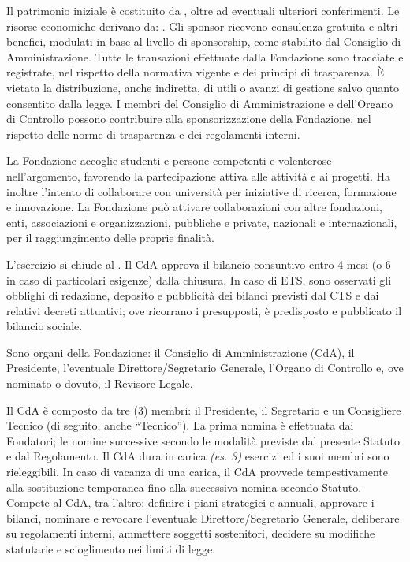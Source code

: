 \documentclass[11pt,a4paper]{article}
\begin{document}
 Il patrimonio iniziale è costituito da , oltre ad eventuali ulteriori conferimenti.
 Le risorse economiche derivano da: \FontiFinanziamento. 
 Gli sponsor ricevono consulenza gratuita e altri benefici, modulati in base al livello di sponsorship, come stabilito dal Consiglio di Amministrazione.
 Tutte le transazioni effettuate dalla Fondazione sono tracciate e registrate, nel rispetto della normativa vigente e dei principi di trasparenza.
È vietata la distribuzione, anche indiretta, di utili o avanzi di gestione salvo quanto consentito dalla legge.
 I membri del Consiglio di Amministrazione e dell'Organo di Controllo possono contribuire alla sponsorizzazione della Fondazione, nel rispetto delle norme di trasparenza e dei regolamenti interni.

 La Fondazione accoglie studenti e persone competenti e volenterose nell’argomento, favorendo la partecipazione attiva alle attività e ai progetti. Ha inoltre l’intento di collaborare con università per iniziative di ricerca, formazione e innovazione.
 La Fondazione può attivare collaborazioni con altre fondazioni, enti, associazioni e organizzazioni, pubbliche e private, nazionali e internazionali, per il raggiungimento delle proprie finalità.

 L'esercizio si chiude al . Il CdA approva il bilancio consuntivo entro 4 mesi (o 6 in caso di particolari esigenze) dalla chiusura.
\ifETS
{} In caso di ETS, sono osservati gli obblighi di redazione, deposito e pubblicità dei bilanci previsti dal CTS e dai relativi decreti attuativi; ove ricorrano i presupposti, è predisposto e pubblicato il bilancio sociale.
\fi

 Sono organi della Fondazione: il Consiglio di Amministrazione (CdA), il Presidente, l'eventuale Direttore/Segretario Generale, l'Organo di Controllo e, ove nominato o dovuto, il Revisore Legale.

 Il CdA è composto da tre (3) membri: il Presidente, il Segretario e un Consigliere Tecnico (di seguito, anche ``Tecnico''). La prima nomina è effettuata dai Fondatori; le nomine successive secondo le modalità previste dal presente Statuto e dal Regolamento.
 Il CdA dura in carica \textit{(es. 3)} esercizi ed i suoi membri sono rieleggibili. In caso di vacanza di una carica, il CdA provvede tempestivamente alla sostituzione temporanea fino alla successiva nomina secondo Statuto.
 Compete al CdA, tra l'altro: definire i piani strategici e annuali, approvare i bilanci, nominare e revocare l'eventuale Direttore/Segretario Generale, deliberare su regolamenti interni, ammettere soggetti sostenitori, decidere su modifiche statutarie e scioglimento nei limiti di legge.
\end{document}
